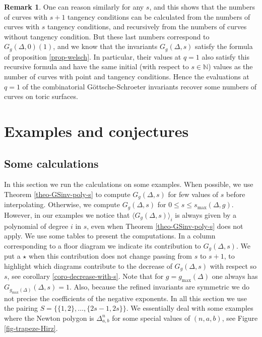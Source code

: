 \documentclass[11pt]{article}
\theoremstyle{definition}
\newtheorem{rema}[theo]{Remark}
\numberwithin{equation}{section}
\newcommand{\N}{\mathbb{N}}
\newcommand{\gmax}{g_{\max}}
\newcommand{\smax}{s_{\max}}
\theoremstyle{plain}
\begin{document}
\begin{rema}
One can reason similarly for any $s$, and this shows that the numbers of curves with $s+1$ tangency conditions can be calculated from the numbers of curves with $s$ tangency conditions, and recursively from the numbers of curves without tangency condition. 
But these last numbers correspond to $G_g(\Delta,0)(1)$, and we know that the invariants $G_g(\Delta,s)$ satisfy the formula of proposition \ref{prop-welsch}.
In particular, their values at $q=1$ also satisfy this recursive formula and have the same initial (with respect to $s\in\N$) values as the number of curves with point and tangency conditions. Hence the evaluations at $q=1$ of the combinatorial Göttsche-Schroeter invariants recover some numbers of curves on toric surfaces.
\end{rema}



\section{Examples and conjectures}

\subsection{Some calculations} \label{subsec-ex-combi-GS-inv}

In this section we run the calculations on some examples. When possible, we use Theorem \ref{theo-GSinv-poly-s} to compute $G_g(\Delta,s)$ for few values of $s$ before interpolating. Otherwise, we compute $G_g(\Delta,s)$ for $0\leqslant s \leqslant \smax(\Delta,g)$. However, in our examples we notice that $\langle G_g(\Delta,s) \rangle_i$ is always given by a polynomial of degree $i$ in $s$, even when Theorem \ref{theo-GSinv-poly-s} does not apply. 
We use some tables to present the computations. In a column corresponding to a floor diagram we indicate its contribution to $G_g(\Delta,s)$. We put a $\star$ when this contribution does not change passing from $s$ to $s+1$, to highlight which diagrams contribute to the decrease of $G_g(\Delta,s)$ with respect so $s$, see corollary \ref{coro-decrease-with-s}. Note that for $g=\gmax(\Delta)$ one always has $G_{\gmax(\Delta)}(\Delta,s)=1$. Also, because the refined invariants are symmetric we do not precise the coefficients of the negative exponents. In all this section we use the pairing $S = \{\{1,2\},\dots,\{2s-1,2s\}\}$. We essentially deal with some examples where the Newton polygon is $\Delta^n_{a,b}$ for some special values of $(n,a,b)$, see Figure \ref{fig-trapeze-Hirz}.
\end{document}
